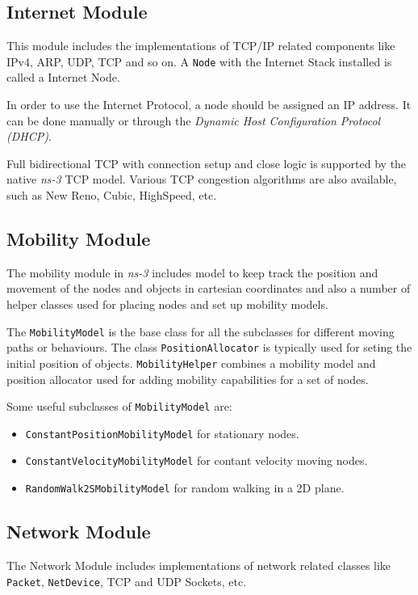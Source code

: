 \subsection{Internet Module}
This module includes the implementations of TCP/IP related components like IPv4, ARP, UDP, TCP and so on.
A \texttt{Node} with the Internet Stack installed is called a Internet Node.

In order to use the Internet Protocol, a node should be assigned an IP address. It can be done manually
or through the \textit{Dynamic Host Configuration Protocol (DHCP)}.

Full bidirectional TCP with connection setup and close logic is supported by the native \textit{ns-3} TCP model.
Various TCP congestion algorithms are also available, such as New Reno, Cubic, HighSpeed, etc.


\subsection{Mobility Module}
The mobility module in \textit{ns-3} includes model to keep track the position and movement of the nodes and objects 
in cartesian coordinates and also a number of helper classes used for placing nodes and set up mobility 
models.

The \texttt{MobilityModel} is the base class for all the subclasses for different moving paths or behaviours.
The class \texttt{PositionAllocator} is typically used for seting the initial position of objects. \texttt{MobilityHelper}
combines a mobility model and position allocator used for adding mobility capabilities for a set 
of nodes.

Some useful subclasses of \texttt{MobilityModel} are:
\begin{itemize}[noitemsep, topsep=0pt]
  \item \texttt{ConstantPositionMobilityModel} for stationary nodes.
  \item \texttt{ConstantVelocityMobilityModel} for contant velocity moving nodes.
  \item \texttt{RandomWalk2SMobilityModel} for random walking in a 2D plane.
\end{itemize}


\subsection{Network Module}
The Network Module includes implementations of network related classes like 
\texttt{Packet}, \texttt{NetDevice}, TCP and UDP Sockets, etc.

